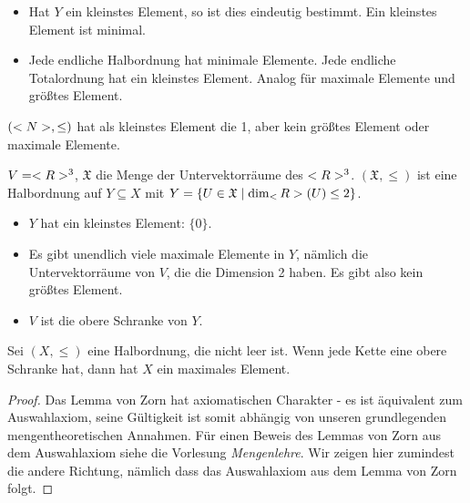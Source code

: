 \begin{remark}
	\begin{itemize}
		\item Hat $Y$ ein kleinstes Element, so ist dies eindeutig bestimmt. Ein kleinstes Element ist minimal.
		\item Jede endliche Halbordnung hat minimale Elemente. Jede endliche Totalordnung hat ein kleinstes Element. Analog für maximale Elemente und größtes Element.
	\end{itemize}
\end{remark}

\begin{example}
	$(<N>,\le)$ hat als kleinstes Element die 1, aber kein größtes Element oder maximale Elemente.
\end{example}

\begin{example}
	$V=<R>^3$, $\mathfrak{X}$ die Menge der Untervektorräume des $<R>^3$. $(\mathfrak{X},\le)$ ist eine Halbordnung auf $Y\subseteq X$ mit $Y=\{U\in\mathfrak{X}\mid \dim_\real(U)\le 2\}$. 
	\begin{itemize}
		\item $Y$ hat ein kleinstes Element: $\{0\}$.
		\item Es gibt unendlich viele maximale Elemente in $Y$, nämlich die Untervektorräume von $V$, die die Dimension 2 haben. Es gibt also kein größtes Element.
		\item $V$ ist die obere Schranke von $Y$.
	\end{itemize}
\end{example}

\begin{theorem}
	Sei $(X,\le)$ eine Halbordnung, die nicht leer ist. Wenn jede Kette eine obere Schranke hat, dann hat $X$ ein maximales Element.
\end{theorem}
\begin{proof}
	Das Lemma von Zorn hat axiomatischen Charakter - es ist äquivalent zum Auswahlaxiom, seine Gültigkeit ist somit abhängig von unseren grundlegenden mengentheoretischen Annahmen. Für einen Beweis des Lemmas von Zorn aus dem Auswahlaxiom siehe die Vorlesung \textit{Mengenlehre}. Wir zeigen hier zumindest die andere Richtung, nämlich dass das Auswahlaxiom aus dem Lemma von Zorn folgt.
\end{proof}

